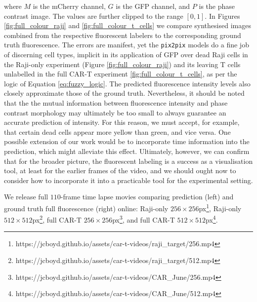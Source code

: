 where $M$ is the mCherry channel, $G$ is the GFP channel, and $P$ is the phase contrast image. The values are further clipped to the range $[0, 1]$. In Figures \ref{fig:full_colour_raji} and \ref{fig:full_colour_t_cells} we compare synthesised images combined from the respective fluorescent labelers to the corresponding ground truth fluorescence. The errors are manifest, yet the \texttt{pix2pix} models do a fine job of discerning cell types, implicit in its application of GFP over dead Raji cells in the Raji-only experiment (Figure \ref{fig:full_colour_raji}) and its leaving T cells unlabelled in the full CAR-T experiment \ref{fig:full_colour_t_cells}, as per the logic of Equation \ref{eq:fuzzy_logic}. The predicted fluorescence intensity levels also closely approximate those of the ground truth. Nevertheless, it should be noted that the the mutual information between fluorescence intensity and phase contrast morphology may ultimately be too small to always guarantee an accurate prediction of intensity. For this reason, we must accept, for example, that certain dead cells appear more yellow than green, and vice versa. One possible extension of our work would be to incorporate time information into the prediction, which might alleviate this effect. Ultimately, however, we can confirm that for the broader picture, the fluorescent labeling is a success as a visualisation tool, at least for the earlier frames of the video, and we should ought now to consider how to incorporate it into a practicable tool for the experimental setting.

We release full $110$-frame time lapse movies comparing prediction (left) and ground truth full fluorescence (right) online: Raji-only $256\times256$px\footnote{https://jcboyd.github.io/assets/car-t-videos/raji\_target/256.mp4}, Raji-only $512\times512$px\footnote{https://jcboyd.github.io/assets/car-t-videos/raji\_target/512.mp4}, full CAR-T $256\times256$px\footnote{https://jcboyd.github.io/assets/car-t-videos/CAR\_June/256.mp4}, and full CAR-T $512\times512$px\footnote{https://jcboyd.github.io/assets/car-t-videos/CAR\_June/512.mp4}.

